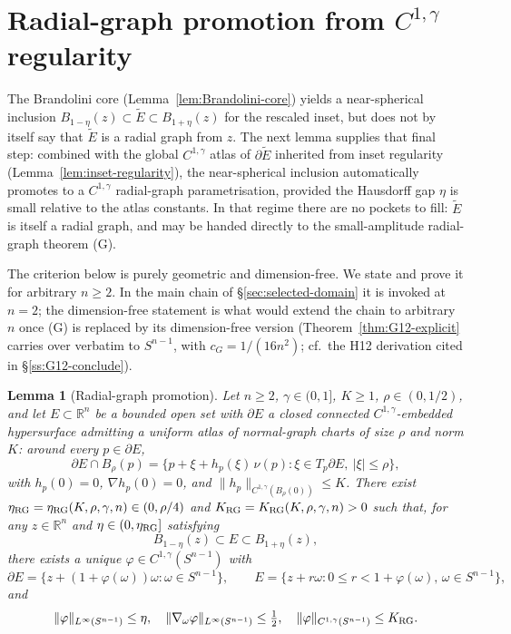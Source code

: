 \documentclass[11pt]{amsart}
\newtheorem{lemma}[theorem]{Lemma}
\newcommand{\R}{\mathbb R}
\newcommand{\Etil}{\widetilde E}
\begin{document}
\section{Radial-graph promotion from $C^{1,\gamma}$ regularity}
\label{sec:radialgraph}

The Brandolini core (Lemma~\ref{lem:Brandolini-core}) yields a
near-spherical inclusion
\(B_{1-\eta}(z)\subset\Etil\subset B_{1+\eta}(z)\) for the rescaled
inset, but does not by itself say that \(\Etil\) is a radial graph
from \(z\).  The next lemma supplies that final step: combined with
the global \(C^{1,\gamma}\) atlas of \(\partial\Etil\) inherited from
inset regularity (Lemma~\ref{lem:inset-regularity}), the
near-spherical inclusion automatically promotes to a \(C^{1,\gamma}\)
radial-graph parametrisation, provided the Hausdorff gap \(\eta\) is
small relative to the atlas constants.  In that regime there are no
pockets to fill: \(\Etil\) is itself a radial graph, and may be
handed directly to the small-amplitude radial-graph theorem (G).

The criterion below is purely geometric and dimension-free.  We
state and prove it for arbitrary \(n\ge 2\).  In the main chain of
\S\ref{sec:selected-domain} it is invoked at \(n=2\); the
dimension-free statement is what would extend the chain to
arbitrary \(n\) once (G) is replaced by its dimension-free version
(Theorem~\ref{thm:G12-explicit} carries over verbatim to
\(S^{n-1}\), with \(c_G=1/(16 n^2)\); cf.\ the H12 derivation cited
in \S\ref{ss:G12-conclude}).

\begin{lemma}[Radial-graph promotion]\label{lem:radialgraph}
Let \(n\ge 2\), \(\gamma\in(0,1]\), \(K\ge 1\), \(\rho\in(0,1/2)\),
and let \(E\subset\R^n\) be a bounded open set with \(\partial E\) a
closed connected \(C^{1,\gamma}\)-embedded hypersurface admitting a
uniform atlas of \emph{normal-graph charts} of size \(\rho\) and
norm \(K\): around every \(p\in\partial E\),
\[
   \partial E\cap B_\rho(p)
      =\bigl\{p+\xi+h_p(\xi)\,\nu(p):\xi\in T_p\partial E,\
         |\xi|\le\rho\bigr\},
\]
with \(h_p(0)=0\), \(\nabla h_p(0)=0\), and
\(\|h_p\|_{C^{1,\gamma}(B_\rho(0))}\le K\).  There exist
\(\eta_{\rm RG}=\eta_{\rm RG}(K,\rho,\gamma,n)\in(0,\rho/4)\) and
\(K_{\rm RG}=K_{\rm RG}(K,\rho,\gamma,n)>0\) such that, for any
\(z\in\R^n\) and \(\eta\in(0,\eta_{\rm RG}]\) satisfying
\begin{equation}\label{eq:RG-shell}
   B_{1-\eta}(z)\subset E\subset B_{1+\eta}(z),
\end{equation}
there exists a unique \(\varphi\in C^{1,\gamma}(S^{n-1})\) with
\begin{equation}\label{eq:RG-graph}
   \partial E
      =\bigl\{z+(1+\varphi(\omega))\omega:\omega\in S^{n-1}\bigr\},
   \qquad
   E=\bigl\{z+r\omega:0\le r<1+\varphi(\omega),\,\omega\in S^{n-1}
   \bigr\},
\end{equation}
and
\begin{equation}\label{eq:RG-bounds}
   \|\varphi\|_{L^\infty(S^{n-1})}\le\eta,
   \quad
   \|\nabla_\omega\varphi\|_{L^\infty(S^{n-1})}\le\tfrac12,
   \quad
   \|\varphi\|_{C^{1,\gamma}(S^{n-1})}\le K_{\rm RG}.
\end{equation}
\end{lemma}
\end{document}
